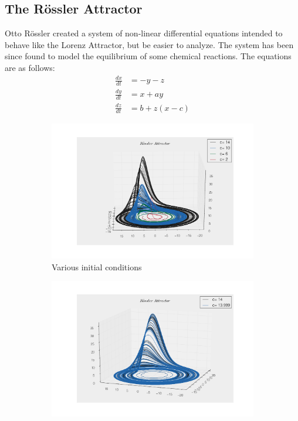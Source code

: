 \documentclass[paper=a4, fontsize=11pt, abstract=on]{scrartcl} %
\numberwithin{equation}{section}
\numberwithin{figure}{section}
\numberwithin{table}{section}
\begin{document}
\subsection{The R\"{o}ssler Attractor}
\label{sec:ross}

Otto R\"{o}ssler created a system of non-linear differential equations
intended to behave like the Lorenz Attractor, but be easier to
analyze\cite{rossler}. The system has been since found to model the
equilibrium of some chemical reactions. The equations are as follows:
\begin{align}
  \label{eq:rossler}
  \frac{dx}{dt} &= -y - z\\
  \frac{dy}{dt} &= x + ay \\
  \frac{dz}{dt} &= b + z(x-c)
\end{align}

\begin{figure}
        \centering
        \begin{subfigure}[b]{0.7\textwidth}
                \includegraphics[width=\textwidth]{rossler}
                \caption{Various initial conditions}
                \label{fig:rosslera}
        \end{subfigure}%
        \hspace{1mm}
        \begin{subfigure}[b]{0.7\textwidth}
                \includegraphics[width=\textwidth]{rossler2_3d}

\end{subfigure}
\end{figure}
\end{document}
